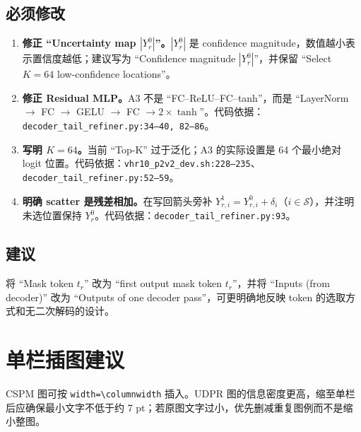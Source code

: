 \documentclass[UTF8,11pt]{ctexart}
\begin{document}
\subsection*{必须修改}
\begin{enumerate}
  \item \textbf{修正 ``Uncertainty map $|Y_r^0|$''。}$|Y_r^0|$ 是 confidence magnitude，数值越小表示置信度越低；建议写为 ``Confidence magnitude $|Y_r^0|$''，并保留 ``Select $K=64$ low-confidence locations''。
  \item \textbf{修正 Residual MLP。}A3 不是 ``FC--ReLU--FC--tanh''，而是 ``LayerNorm $\rightarrow$ FC $\rightarrow$ GELU $\rightarrow$ FC $\rightarrow 2\times\tanh$''。代码依据：\texttt{decoder\_tail\_refiner.py:34--40, 82--86}。
  \item \textbf{写明 $K=64$。}当前 ``Top-K'' 过于泛化；A3 的实际设置是 64 个最小绝对 logit 位置。代码依据：\texttt{vhr10\_p2v2\_dev.sh:228--235}、\texttt{decoder\_tail\_refiner.py:52--59}。
  \item \textbf{明确 scatter 是残差相加。}在写回箭头旁补 $Y_{r,i}^{1}=Y_{r,i}^{0}+\delta_i$（$i\in\mathcal S$），并注明未选位置保持 $Y_r^0$。代码依据：\texttt{decoder\_tail\_refiner.py:93}。
\end{enumerate}

\subsection*{建议}
将 ``Mask token $t_r$'' 改为 ``first output mask token $t_r$''，并将 ``Inputs (from decoder)'' 改为 ``Outputs of one decoder pass''，可更明确地反映 token 的选取方式和无二次解码的设计。

\section*{单栏插图建议}
CSPM 图可按 \verb|width=\columnwidth| 插入。UDPR 图的信息密度更高，缩至单栏后应确保最小文字不低于约 7 pt；若原图文字过小，优先删减重复图例而不是缩小整图。
\end{document}
